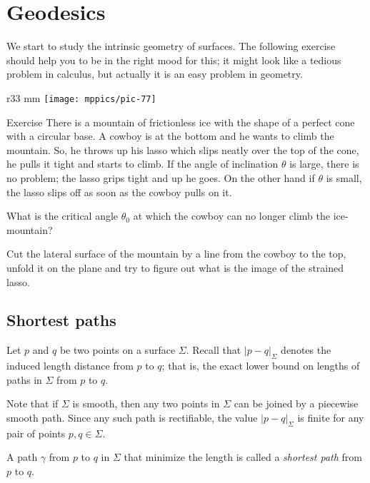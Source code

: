 \chapter{Geodesics}

We start to study the intrinsic geometry of surfaces.
The following exercise should help you to be in the right mood for this;
it might look like a tedious problem in calculus, but actually it is an easy problem in geometry.


\begin{wrapfigure}{r}{33 mm}
\vskip-0mm
\centering
\texttt{[image: mppics/pic-77]}
\vskip-0mm
\end{wrapfigure}

\begin{thm}{Exercise}\label{ex:lasso}
There is a mountain of frictionless ice with the shape of a perfect cone with a circular base.
A cowboy is at the bottom and he wants to climb the mountain.
So, he throws up his lasso which slips neatly over the top of the cone, he pulls it tight and starts to climb.
If the angle of inclination $\theta$ is large, there is no problem; the lasso grips tight and up he goes.
On the other hand if $\theta$ is small, the lasso slips off as soon as the cowboy pulls on it.

What is the critical angle $\theta_0$ at which the cowboy can no longer climb the ice-mountain?
\end{thm}

 Cut the lateral surface of the mountain by a line from the cowboy to the top, unfold it on the plane and try to figure out what is the image of the strained lasso.

\section*{Shortest paths}

Let $p$ and $q$ be two points on a surface $\Sigma$.
Recall that $|p-q|_\Sigma$ denotes the induced length distance from $p$ to $q$;
that is, the exact lower bound on lengths of paths in $\Sigma$ from $p$ to $q$.

Note that if $\Sigma$ is smooth, then any two points in $\Sigma$ can be joined by a piecewise smooth path.
Since any such path is rectifiable, the value $|p-q|_\Sigma$ is finite for any pair of points $p,q\in\Sigma$.

A path $\gamma$ from $p$ to $q$ in $\Sigma$ that minimize the length is called a \emph{shortest path} from $p$ to $q$.

